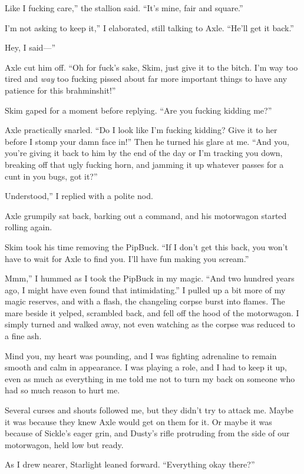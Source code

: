 \leavevmode{}Like I fucking care,” the stallion said. “It’s mine, fair and square.”

\leavevmode{}I’m not asking to keep it,” I elaborated, still talking to Axle. “He’ll get it back.”

\leavevmode{}Hey, I said—”

Axle cut him off. “Oh for fuck’s sake, Skim, just give it to the bitch. I’m way too tired and \textit{way} too fucking pissed about far more important things to have any patience for this brahminshit!”

Skim gaped for a moment before replying. “Are you fucking kidding me?”

Axle practically snarled. “Do I look like I’m fucking kidding? Give it to her before I stomp your damn face in!” Then he turned his glare at me. “And you, you’re giving it back to him by the end of the day or I’m tracking you down, breaking off that ugly fucking horn, and jamming it up whatever passes for a cunt in you bugs, got it?”

\leavevmode{}Understood,” I replied with a polite nod.

Axle grumpily sat back, barking out a command, and his motorwagon started rolling again.

Skim took his time removing the PipBuck. “If I don’t get this back, you won’t have to wait for Axle to find you. I’ll have fun making you scream.”

\leavevmode{}Mmm,” I hummed as I took the PipBuck in my magic. “And two hundred years ago, I might have even found that intimidating.” I pulled up a bit more of my magic reserves, and with a flash, the changeling corpse burst into flames. The mare beside it yelped, scrambled back, and fell off the hood of the motorwagon. I simply turned and walked away, not even watching as the corpse was reduced to a fine ash.

Mind you, my heart was pounding, and I was fighting adrenaline to remain smooth and calm in appearance. I was playing a role, and I had to keep it up, even as much as everything in me told me not to turn my back on someone who had so much reason to hurt me.

Several curses and shouts followed me, but they didn’t try to attack me. Maybe it was because they knew Axle would get on them for it. Or maybe it was because of Sickle’s eager grin, and Dusty’s rifle protruding from the side of our motorwagon, held low but ready.

As I drew nearer, Starlight leaned forward. “Everything okay there?”

